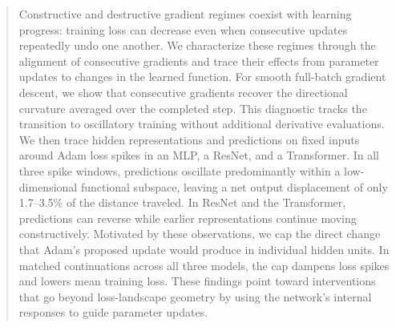 \begin{abstract}
Constructive and destructive gradient regimes coexist with learning progress: training loss can decrease even when consecutive updates repeatedly undo one another. We characterize these regimes through the alignment of consecutive gradients and trace their effects from parameter updates to changes in the learned function. For smooth full-batch gradient descent, we show that consecutive gradients recover the directional curvature averaged over the completed step. This diagnostic tracks the transition to oscillatory training without additional derivative evaluations. We then trace hidden representations and predictions on fixed inputs around Adam loss spikes in an MLP, a ResNet, and a Transformer. In all three spike windows, predictions oscillate predominantly within a low-dimensional functional subspace, leaving a net output displacement of only 1.7--3.5\% of the distance traveled. In ResNet and the Transformer, predictions can reverse while earlier representations continue moving constructively. Motivated by these observations, we cap the direct change that Adam's proposed update would produce in individual hidden units. In matched continuations across all three models, the cap dampens loss spikes and lowers mean training loss. These findings point toward interventions that go beyond loss-landscape geometry by using the network's internal responses to guide parameter updates.
\end{abstract}
